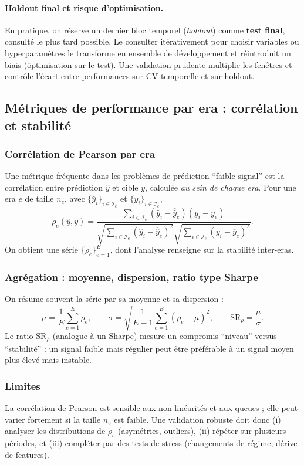 \documentclass[11pt,a4paper]{article}
\newcommand{\1}{\mathbf{1}}
\begin{document}
\paragraph{Holdout final et risque d'optimisation.}
En pratique, on r\'eserve un dernier bloc temporel (\emph{holdout}) comme \textbf{test final}, consult\'e le plus tard possible.
Le consulter it\'erativement pour choisir variables ou hyperparam\`etres le transforme en ensemble de d\'eveloppement et r\'eintroduit un biais
(\"optimisation sur le test\"). Une validation prudente multiplie les fen\^etres et contr\^ole l'\'ecart entre performances sur CV temporelle et sur holdout.

\subsection{M\'etriques de performance par era : corr\'elation et stabilit\'e}

\subsubsection{Corr\'elation de Pearson par era}
Une m\'etrique fr\'equente dans les probl\`emes de pr\'ediction ``faible signal'' est la corr\'elation entre pr\'ediction $\widehat y$ et cible $y$,
calcul\'ee \emph{au sein de chaque era}. Pour une era $e$ de taille $n_e$, avec $\{\widehat y_i\}_{i\in\mathcal{I}_e}$ et $\{y_i\}_{i\in\mathcal{I}_e}$,
\[
\rho_e(\widehat y,y)=
\frac{\sum_{i\in\mathcal{I}_e}(\widehat y_i-\overline{\widehat y}_e)(y_i-\overline y_e)}
{\sqrt{\sum_{i\in\mathcal{I}_e}(\widehat y_i-\overline{\widehat y}_e)^2}\sqrt{\sum_{i\in\mathcal{I}_e}(y_i-\overline y_e)^2}}.
\]
On obtient une s\'erie $\{\rho_e\}_{e=1}^E$, dont l'analyse renseigne sur la stabilit\'e inter-eras.

\subsubsection{Agr\'egation : moyenne, dispersion, ratio type Sharpe}
On r\'esume souvent la s\'erie par sa moyenne et sa dispersion :
\[
\mu = \frac{1}{E}\sum_{e=1}^E\rho_e,
\qquad
\sigma = \sqrt{\frac{1}{E-1}\sum_{e=1}^E(\rho_e-\mu)^2},
\qquad
\mathrm{SR}_{\rho}=\frac{\mu}{\sigma}.
\]
Le ratio $\mathrm{SR}_{\rho}$ (analogue \`a un Sharpe) mesure un compromis ``niveau'' versus ``stabilit\'e'' : un signal faible mais r\'egulier peut \^etre
pr\'ef\'erable \`a un signal moyen plus \'elev\'e mais instable.

\subsubsection{Limites}
La corr\'elation de Pearson est sensible aux non-lin\'earit\'es et aux queues ; elle peut varier fortement si la taille $n_e$ est faible.
Une validation robuste doit donc (i) analyser les distributions de $\rho_e$ (asym\'etries, outliers), (ii) r\'ep\'eter sur plusieurs p\'eriodes,
et (iii) compl\'eter par des tests de stress (changements de r\'egime, d\'erive de features).
\end{document}
